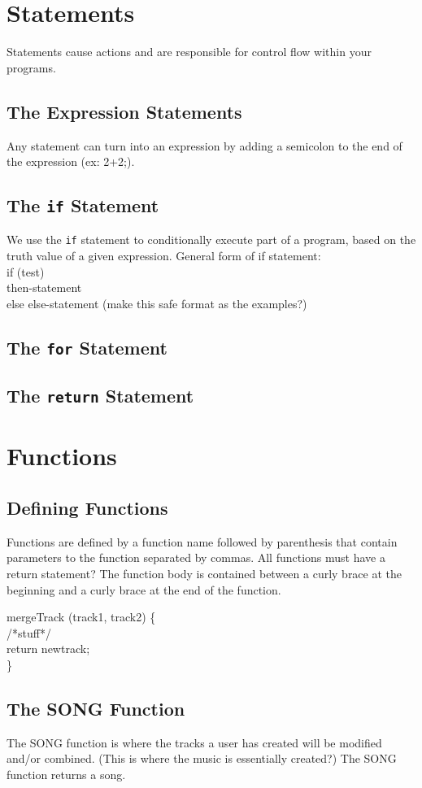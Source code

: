 \documentclass[letterpaper]{article}
\begin{document}
\section{Statements}
Statements cause actions and are responsible for control flow within your programs.
\subsection{The Expression Statements}
Any statement can turn into an expression by adding a semicolon to the end of the expression (ex: 2+2;). 
\subsection{The \texttt{if} Statement}
We use the \texttt{if} statement to conditionally execute part of a program, based on the truth value of a given expression.
General form of if statement: \\
if (test) \\
then-statement \\
else
else-statement (make this safe format as the examples?)
\subsection{The \texttt{for} Statement}
\subsection{The \texttt{return} Statement}
\section{Functions}
\subsection{Defining Functions}
Functions are defined by a function name followed by parenthesis that contain parameters to the function separated by commas. All functions must have a return statement? The function body is contained between a curly brace at the beginning and a curly brace at the end of the function.

mergeTrack (track1, track2) \{ \\
		/*stuff*/ \\
	return newtrack;\\
\}


\subsection{The SONG Function}
The SONG function is where the tracks a user has created will be modified and/or combined. (This is where the music is essentially created?) The SONG function returns a song.
\end{document}
